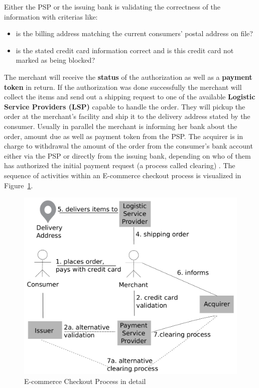 Either the \gls{PSP} or the issuing bank is validating the correctness of the information with criterias like: \@

\begin{itemize}
    \item is the billing address matching the current consumers' postal address on file?
    \item is the stated credit card information correct and is this credit card not marked as being blocked?
\end{itemize}

The merchant will receive the \textbf{status} of the authorization as well as a \textbf{payment token} in return. If the authorization was done successfully the merchant will collect the items and send out a shipping request to one of the available \textbf{Logistic Service Providers (\gls{LSP})} capable to handle the order. They will pickup the order at the merchant's facility and ship it to the delivery address stated by the consumer. Usually in parallel the merchant is informing her bank about the order, amount due as well as payment token from the \gls{PSP}. The acquirer is in charge to withdrawal the amount of the order from the consumer's bank account either via the \gls{PSP} or directly from the issuing bank, depending on who of them has authorized the initial payment request (a process called clearing) \citep{VisaPayment2014}. The sequence of activities within an E-commerce checkout process is visualized in Figure~\ref{fig:images_ecommerce_checkout_process}.\@

\begin{figure}[H]
	\centering
		\includegraphics[width=0.8\columnwidth]{images/e-commerce-checkout-process.pdf}
	\caption{E-commerce Checkout Process in detail}
\label{fig:images_ecommerce_checkout_process}
\end{figure}

